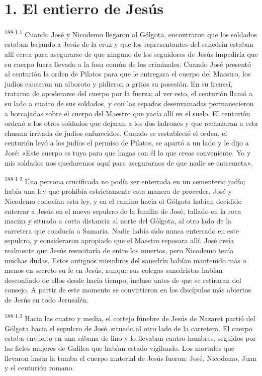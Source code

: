 \section*{1. El entierro de Jesús}
\par 
\textsuperscript{188:1.1} Cuando José y Nicodemo llegaron al Gólgota, encontraron que los soldados estaban bajando a Jesús de la cruz y que los representantes del sanedrín estaban allí cerca para asegurarse de que ninguno de los seguidores de Jesús impediría que su cuerpo fuera llevado a la fosa común de los criminales. Cuando José presentó al centurión la orden de Pilatos para que le entregara el cuerpo del Maestro, los judíos causaron un alboroto y pidieron a gritos su posesión. En su frenesí, trataron de apoderarse del cuerpo por la fuerza; al ver esto, el centurión llamó a su lado a cuatro de sus soldados, y con las espadas desenvainadas permanecieron a horcajadas sobre el cuerpo del Maestro que yacía allí en el suelo. El centurión ordenó a los otros soldados que dejaran a los dos ladrones y que rechazaran a esta chusma irritada de judíos enfurecidos. Cuando se restableció el orden, el centurión leyó a los judíos el permiso de Pilatos, se apartó a un lado y le dijo a José: «Este cuerpo es tuyo para que hagas con él lo que creas conveniente. Yo y mis soldados nos quedaremos aquí para asegurarnos de que nadie se entremeta».

\par 
\textsuperscript{188:1.2} Una persona crucificada no podía ser enterrada en un cementerio judío; había una ley que prohibía estrictamente esta manera de proceder. José y Nicodemo conocían esta ley, y en el camino hacia el Gólgota habían decidido enterrar a Jesús en el nuevo sepulcro de la familia de José, tallado en la roca maciza y situado a corta distancia al norte del Gólgota, al otro lado de la carretera que conducía a Samaria. Nadie había sido nunca enterrado en este sepulcro, y consideraron apropiado que el Maestro reposara allí. José creía realmente que Jesús resucitaría de entre los muertos, pero Nicodemo tenía muchas dudas. Estos antiguos miembros del sanedrín habían mantenido más o menos en secreto su fe en Jesús, aunque sus colegas sanedristas habían desconfiado de ellos desde hacía tiempo, incluso antes de que se retiraran del consejo. A partir de este momento se convirtieron en los discípulos más abiertos de Jesús en todo Jerusalén.

\par 
\textsuperscript{188:1.3} Hacia las cuatro y media, el cortejo fúnebre de Jesús de Nazaret partió del Gólgota hacia el sepulcro de José, situado al otro lado de la carretera. El cuerpo estaba envuelto en una sábana de lino y lo llevaban cuatro hombres, seguidos por las fieles mujeres de Galilea que habían estado vigilando. Los mortales que llevaron hasta la tumba el cuerpo material de Jesús fueron: José, Nicodemo, Juan y el centurión romano.


